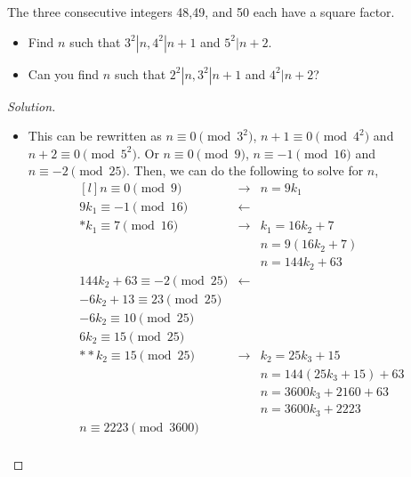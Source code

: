 \documentclass[11pt]{article}
\newenvironment{problem}[2][Problem]{\begin{trivlist}
\item[\hskip \labelsep {\bfseries #1}\hskip \labelsep {\bfseries #2.}]}{\end{trivlist}}
\newenvironment{solution}
  {\renewcommand\qedsymbol{$~$}\begin{proof}[Solution]$ $\par\nobreak\ignorespaces}
  {\end{proof}}
\begin{document}
\begin{problem}{16}
The three consecutive integers 48,49, and 50 each have a square factor.
\begin{itemize}
    \item [(a)] Find $n$ such that $3^2|n,4^2|n+1$ and $5^2|n+2$.
    \item [(b)] Can you find $n$ such that $2^2|n,3^2|n+1$ and $4^2|n+2$?
\end{itemize}
\end{problem}

\begin{solution}
    \begin{itemize}
        \item [(a)]
              This can be rewritten as $n\equiv 0 \pmod{3^2}$, $n+1\equiv 0 \pmod{4^2}$ and $n+2 \equiv 0 \pmod{5^2}$. Or $n\equiv 0 \pmod{9}$, $n \equiv -1 \pmod{16}$ and $n \equiv -2 \pmod{25}$.
              Then, we can do the following to solve for $n$,
              \[
                  \begin{matrix*}[l]
                      n \equiv 0 \pmod{9} & \rightarrow & n=9k_1 \\
                      9k_1 \equiv -1 \pmod{16} & \leftarrow &\\
                      * k_1 \equiv 7 \pmod{16} &\rightarrow & k_1 = 16k_2 + 7 \\
                      && n= 9(16k_2 + 7) \\
                      && n= 144k_2 + 63 \\
                      144k_2 + 63 \equiv -2 \pmod{25} &\leftarrow &\\
                      -6k_2 + 13 \equiv 23 \pmod{25}&& \\
                      -6k_2  \equiv 10 \pmod{25}&& \\
                      6k_2  \equiv 15 \pmod{25}&& \\
                      ** k_2 \equiv 15 \pmod{25}& \rightarrow & k_2 = 25k_3 + 15 \\
                      && n= 144(25k_3 + 15) + 63 \\
                      && n= 3600k_3 + 2160 + 63 \\
                      && n= 3600k_3 + 2223 \\
                      n\equiv 2223 \pmod{3600} \\
                  \end{matrix*}
              \]


\end{itemize}
\end{solution}
\end{document}
